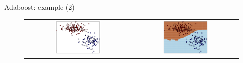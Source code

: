 \begin{frame}{Adaboost: example (2)}
\begin{figure}
\begin{tabular}{cc}
\includegraphics[width=0.45\textwidth]{img/boosting/2_data.pdf}&
\includegraphics[width=0.45\textwidth]{img/boosting/2_boundary.pdf}
\end{tabular}
\end{figure}
\end{frame}
